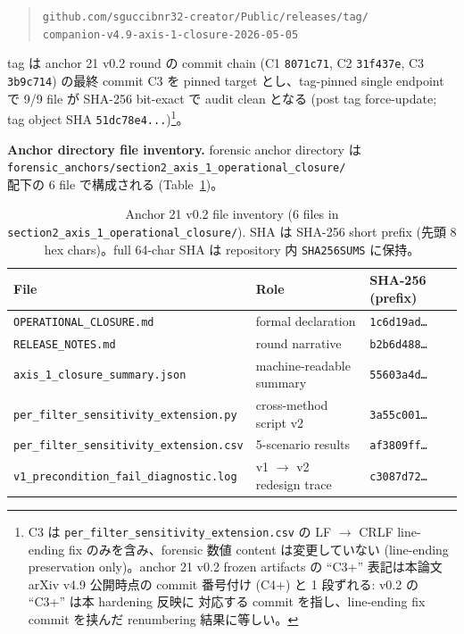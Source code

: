 \documentclass[11pt,a4paper]{ltjsarticle}
\begin{document}
\begin{quote}
\texttt{github.com/sguccibnr32-creator/Public/releases/tag/}\\
\texttt{companion-v4.9-axis-1-closure-2026-05-05}
\end{quote}

\noindent
tag は anchor 21 v0.2 round の commit chain (C1 \texttt{8071c71}, C2 \texttt{31f437e},
C3 \texttt{3b9c714}) の最終 commit C3 を pinned target とし、tag-pinned single endpoint で
9/9 file が SHA-256 bit-exact で audit clean となる (post tag force-update; tag object SHA
\texttt{51dc78e4...})\footnote{C3 は \texttt{per\_filter\_sensitivity\_extension.csv} の
LF $\to$ CRLF line-ending fix のみを含み、forensic 数値 content は変更していない
(line-ending preservation only)。anchor 21 v0.2 frozen artifacts の ``C3+'' 表記は本論文
arXiv v4.9 公開時点の commit 番号付け (C4+) と 1 段ずれる: v0.2 の ``C3+'' は本 hardening 反映に
対応する commit を指し、line-ending fix commit を挟んだ renumbering 結果に等しい。}。

\noindent\textbf{Anchor directory file inventory.}\quad
forensic anchor directory は\\
\hspace*{1em}\texttt{forensic\_anchors/section2\_axis\_1\_operational\_closure/}\\
配下の 6 file で構成される (Table~\ref{tab:anchor-21-v02-files})。

\begin{table}[h]
\centering
\small
\caption{Anchor 21 v0.2 file inventory (6 files in
\texttt{section2\_axis\_1\_operational\_closure/}). SHA は SHA-256 short prefix
(先頭 8 hex chars)。full 64-char SHA は repository 内 \texttt{SHA256SUMS} に保持。}
\label{tab:anchor-21-v02-files}
\begin{tabular}{lll}
\hline
File & Role & SHA-256 (prefix) \\
\hline
\texttt{OPERATIONAL\_CLOSURE.md}                  & formal declaration       & \texttt{1c6d19ad\dots} \\
\texttt{RELEASE\_NOTES.md}                        & round narrative          & \texttt{b2b6d488\dots} \\
\texttt{axis\_1\_closure\_summary.json}           & machine-readable summary & \texttt{55603a4d\dots} \\
\texttt{per\_filter\_sensitivity\_extension.py}   & cross-method script v2   & \texttt{3a55c001\dots} \\
\texttt{per\_filter\_sensitivity\_extension.csv}  & 5-scenario results       & \texttt{af3809ff\dots} \\
\texttt{v1\_precondition\_fail\_diagnostic.log}   & v1 $\to$ v2 redesign trace & \texttt{c3087d72\dots} \\
\hline
\end{tabular}
\end{table}
\end{document}
